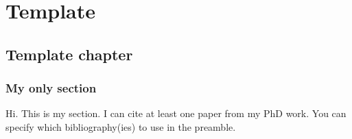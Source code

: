 \part{Template}\label{part:template}
\chapter{Template chapter}\label{ch:template}


\section{My only section}
Hi. This is my section. I can cite at least one paper from my PhD work\cite{PHuft2022}. You can specify which bibliography(ies) to use in the preamble.